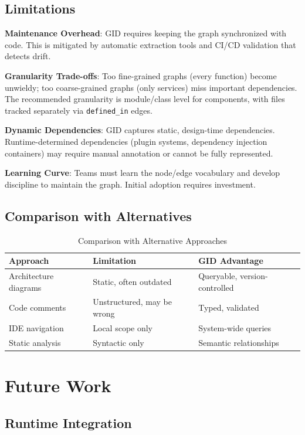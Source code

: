 \documentclass[11pt,a4paper]{article}
\begin{document}
\subsection{Limitations}

\textbf{Maintenance Overhead}: GID requires keeping the graph synchronized with code. This is mitigated by automatic extraction tools and CI/CD validation that detects drift.

\textbf{Granularity Trade-offs}: Too fine-grained graphs (every function) become unwieldy; too coarse-grained graphs (only services) miss important dependencies. The recommended granularity is module/class level for components, with files tracked separately via \texttt{defined\_in} edges.

\textbf{Dynamic Dependencies}: GID captures static, design-time dependencies. Runtime-determined dependencies (plugin systems, dependency injection containers) may require manual annotation or cannot be fully represented.

\textbf{Learning Curve}: Teams must learn the node/edge vocabulary and develop discipline to maintain the graph. Initial adoption requires investment.

\subsection{Comparison with Alternatives}

\begin{table}[h]
\centering
\caption{Comparison with Alternative Approaches}
\begin{tabular}{@{}lll@{}}
\toprule
\textbf{Approach} & \textbf{Limitation} & \textbf{GID Advantage} \\
\midrule
Architecture diagrams & Static, often outdated & Queryable, version-controlled \\
Code comments & Unstructured, may be wrong & Typed, validated \\
IDE navigation & Local scope only & System-wide queries \\
Static analysis & Syntactic only & Semantic relationships \\
\bottomrule
\end{tabular}
\end{table}

\section{Future Work}

\subsection{Runtime Integration}
\end{document}
